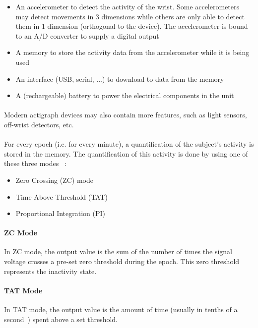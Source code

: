 \documentclass[a4paper,12pt]{article}
\begin{document}
\begin{itemize}
\item An accelerometer to detect the activity of the wrist. Some accelerometers~\cite{Pires2009} may detect movements in 3 dimensions while others are only able to detect them in 1 dimension (orthogonal to the device). The accelerometer is bound to an A/D converter to supply a digital output
\item A memory to store the activity data from the accelerometer while it is being used
\item An interface (USB, serial, ...) to download to data from the memory
\item A (rechargeable) battery to power the electrical components in the unit~\cite{LisaJ.MeltzerHawleyE.Montgomery-DownsSalvatoreP.Insana2012} 
\end{itemize}

\paragraph{}
Modern actigraph devices may also contain more features, such as light sensors, off-wrist detectors, etc.~\cite{LisaJ.MeltzerHawleyE.Montgomery-DownsSalvatoreP.Insana2012}

\paragraph{}
For every epoch (i.e. for every minute), a quantification of the subject's activity is stored in the memory. The quantification of this activity is done by using one of these three modes~\cite{Blackwell2008}\cite{Jean-Louis2001} :

\begin{itemize}
\item Zero Crossing (ZC) mode
\item Time Above Threshold (TAT)
\item Proportional Integration (PI)
\end{itemize}

\paragraph{ZC Mode}
In ZC mode, the output value is the sum of the number of times the signal voltage crosses a pre-set zero threshold during the epoch. This zero threshold represents the inactivity state.

\paragraph{TAT Mode}
In TAT mode, the output value is the amount of time (usually in tenths of a second~\cite{Blackwell2008}) spent above a set threshold.
\end{document}
